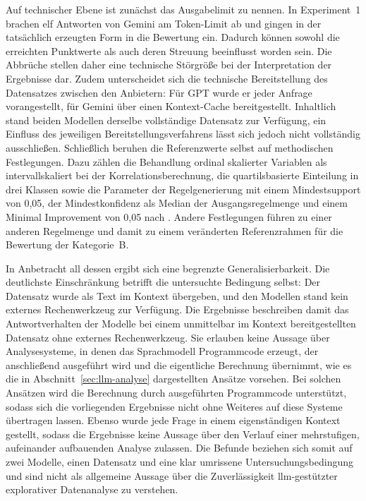 Auf technischer Ebene ist zunächst das Ausgabelimit zu nennen. In Experiment~1 brachen elf Antworten von Gemini am Token-Limit ab und gingen in der tatsächlich erzeugten Form in die Bewertung ein. Dadurch können sowohl die erreichten Punktwerte als auch deren Streuung beeinflusst worden sein. Die Abbrüche stellen daher eine technische Störgröße bei der Interpretation der Ergebnisse dar. Zudem unterscheidet sich die technische Bereitstellung des Datensatzes zwischen den Anbietern: Für GPT wurde er jeder Anfrage vorangestellt, für Gemini über einen Kontext-Cache bereitgestellt. Inhaltlich stand beiden Modellen derselbe vollständige Datensatz zur Verfügung, ein Einfluss des jeweiligen Bereitstellungsverfahrens lässt sich jedoch nicht vollständig ausschließen. Schließlich beruhen die Referenzwerte selbst auf methodischen Festlegungen. Dazu zählen die Behandlung ordinal skalierter Variablen als intervallskaliert bei der Korrelationsberechnung, die quartilsbasierte Einteilung in drei Klassen sowie die Parameter der Regelgenerierung mit einem Mindestsupport von 0,05, der Mindestkonfidenz als Median der Ausgangsregelmenge und einem Minimal Improvement von 0,05 nach \textcite{hammesfahr_identifikation_2021}. Andere Festlegungen führen zu einer anderen Regelmenge und damit zu einem veränderten Referenzrahmen für die Bewertung der Kategorie~B.

In Anbetracht all dessen ergibt sich eine begrenzte Generalisierbarkeit. Die deutlichste Einschränkung betrifft die untersuchte Bedingung selbst: Der Datensatz wurde als Text im Kontext übergeben, und den Modellen stand kein externes Rechenwerkzeug zur Verfügung. Die Ergebnisse beschreiben damit das Antwortverhalten der Modelle bei einem unmittelbar im Kontext bereitgestellten Datensatz ohne externes Rechenwerkzeug. Sie erlauben keine Aussage über Analysesysteme, in denen das Sprachmodell Programmcode erzeugt, der anschließend ausgeführt wird und die eigentliche Berechnung übernimmt, wie es die in Abschnitt~\ref{sec:llm-analyse} dargestellten Ansätze vorsehen. Bei solchen Ansätzen wird die Berechnung durch ausgeführten Programmcode unterstützt, sodass sich die vorliegenden Ergebnisse nicht ohne Weiteres auf diese Systeme übertragen lassen. Ebenso wurde jede Frage in einem eigenständigen Kontext gestellt, sodass die Ergebnisse keine Aussage über den Verlauf einer mehrstufigen, aufeinander aufbauenden Analyse zulassen. Die Befunde beziehen sich somit auf zwei Modelle, einen Datensatz und eine klar umrissene Untersuchungsbedingung und sind nicht als allgemeine Aussage über die Zuverlässigkeit \gls{llm}-gestützter explorativer Datenanalyse zu verstehen.